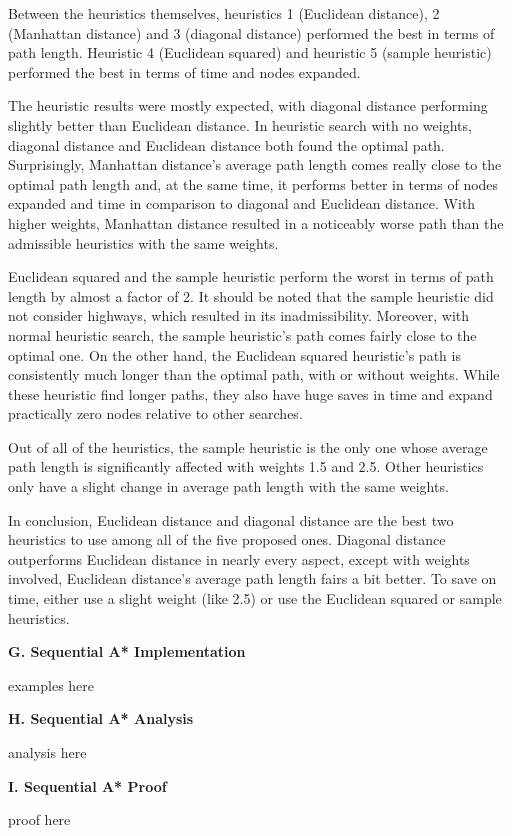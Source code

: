 \documentclass[12pt, letterpaper]{article}
\begin{document}
Between the heuristics themselves, heuristics 1 (Euclidean distance), 2 (Manhattan distance) and 3 (diagonal distance) performed the best in terms of path length. Heuristic 4 (Euclidean squared) and heuristic 5 (sample heuristic) performed the best in terms of time and nodes expanded.

The heuristic results were mostly expected, with diagonal distance performing slightly better than Euclidean distance. In heuristic search with no weights, diagonal distance and Euclidean distance both found the optimal path. Surprisingly, Manhattan distance's average path length comes really close to the optimal path length and, at the same time, it performs better in terms of nodes expanded and time in comparison to diagonal and Euclidean distance. With higher weights, Manhattan distance resulted in a noticeably worse path than the admissible heuristics with the same weights. 

Euclidean squared and the sample heuristic perform the worst in terms of path length by almost a factor of 2. It should be noted that the sample heuristic did not consider highways, which resulted in its inadmissibility. Moreover, with normal heuristic search, the sample heuristic's path comes fairly close to the optimal one. On the other hand, the Euclidean squared heuristic's path is consistently much longer than the optimal path, with or without weights. While these heuristic find longer paths, they also have huge saves in time and expand practically zero nodes relative to other searches.

Out of all of the heuristics, the sample heuristic is the only one whose average path length is significantly affected with weights 1.5 and 2.5. Other heuristics only have a slight change in average path length with the same weights.


In conclusion, Euclidean distance and diagonal distance are the best two heuristics to use among all of the five proposed ones. Diagonal distance outperforms Euclidean distance in nearly every aspect, except with weights involved, Euclidean distance's average path length fairs a bit better. To save on time, either use a slight weight (like 2.5) or use the Euclidean squared or sample heuristics. 

\pagebreak %

\noindent \textbf{G. Sequential A* Implementation}

examples here

\pagebreak %

\noindent \textbf{H. Sequential A* Analysis}

analysis here

\pagebreak %

\noindent \textbf{I. Sequential A* Proof}

proof here
\end{document}

